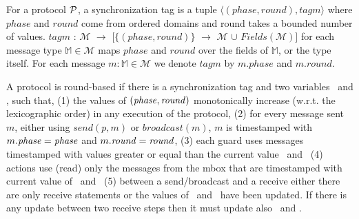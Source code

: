 \begin{definition}
\label{def:synctag}
For a protocol $\mathcal{P}$, a synchronization tag is a tuple 
$\langle(\mathit{phase},\mathit{round}),\mathit{tagm} \rangle$ where $\mathit{phase}$ and $\mathit{round}$ come from ordered domains and round takes a bounded number of values. $\mathit{tagm}$ : $\mathcal{M}$ $\rightarrow$ $[\{(\mathit{phase},\mathit{round})\}$ $\rightarrow$ $\mathcal{M}$ $\cup$ $\mathit{Fields}(\mathcal{M})]$ for each message type $\mathbb{M} \in \mathcal{M}$ maps $\mathit{phase}$ and $\mathit{round}$ over the fields of $\mathbb{M}$, or the type itself.
For each message $m:\mathbb{M} \in \mathcal{M}$ we denote $\mathit{tagm}$ by $\mathit{m.phase}$ and $\mathit{m.round}$.
\end{definition}

A protocol is round-based if there is a synchronization tag and two variables \phase\ and \round, such that, 
(1) the values of $(\mathit{phase},\mathit{round})$ monotonically increase (w.r.t. the lexicographic order) in any execution of the protocol,
(2) for every message sent $m$, either using $\mathit{send(p,m)}$ or $\mathit{broadcast(m)}$, $m$ is timestamped with $m.\mathit{phase}=\mathit{phase}$ and $m.\mathit{round}=\mathit{round}$, 
(3) each guard uses messages timestamped with values greater or equal than the current value \phase\ and \round\, 
(4) actions use (read) only the messages from the mbox that are timestamped with current value of \phase\ and \round\, 
(5) between a send/broadcast and a receive either there are only receive statements or the values of \phase\ and \round\ have been updated. If there is any update between two receive steps then it must update also  \phase\ and \round.  